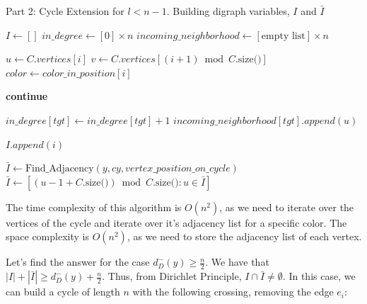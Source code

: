 \begin{algorithm}[H]
    \caption{Part 2: Cycle Extension for \( l < n - 1 \). Building digraph variables, $I$ and $\bar{I}$}
    \begin{algorithmic}[1]
            \State $I \gets []$
            \State $in\_degree \gets [0] \times n$
            \State $incoming\_neighborhood \gets [\text{empty list}] \times n$
            
                \State $u \gets C.vertices[i]$
                \State $v \gets C.vertices[(i + 1) \bmod C.\text{size()}]$
                \State $color \gets color\_in\_position[i]$

                        \State \textbf{continue}
                    \EndIf
                    
                    \State $in\_degree[tgt] \gets in\_degree[tgt] + 1$
                    \State $incoming\_neighborhood[tgt].append(u)$
                    
                        \State $I.append(i)$
                    \EndIf
                \EndFor
            \EndFor
            
            \State $\bar{I} \gets \text{Find\_Adjacency}(y, cy, vertex\_position\_on\_cycle)$
            \State $\bar{I} \gets [(u - 1 + C.\text{size()}) \bmod C.\text{size()} : u \in \bar{I}]$

        \EndFunction
    \end{algorithmic}
\end{algorithm}

The time complexity of this algorithm is $O(n^2)$, as we need to iterate over the vertices of the cycle and iterate over 
it's adjacency list for a specific color. The space complexity is $O(n^2)$, as we need to store the adjacency list of each vertex.

Let's find the answer for the case $d^-_D(y) \geq \frac{n}{2}$. We have that 
$|I| + |\bar{I}|  \geq d^-_D(y) +  \frac{n}{2} $. 
Thus, from Dirichlet Principle, $I \cap \bar{I} \neq \emptyset$. In this case, we can build 
a cycle of length $n$ with the following crossing, removing the edge $e_i$:

